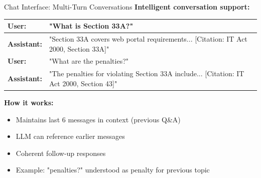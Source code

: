 \documentclass[11pt,aspectratio=16:9]{beamer}
\begin{document}
\begin{frame}{Chat Interface: Multi-Turn Conversations}
    \textbf{Intelligent conversation support:}
    
    \vspace{0.5cm}
    
    \begin{center}
        \small
        \begin{tabular}{|l|p{7cm}|}
            \hline
            \textbf{User:} & "What is Section 33A?" \\
            \hline
            \textbf{Assistant:} & "Section 33A covers web portal requirements... [Citation: IT Act 2000, Section 33A]" \\
            \hline
            \textbf{User:} & "What are the penalties?" \\
            \hline
            \textbf{Assistant:} & "The penalties for violating Section 33A include... [Citation: IT Act 2000, Section 43]" \\
            \hline
        \end{tabular}
    \end{center}
    
    \vspace{0.8cm}
    
    \textbf{How it works:}
    \begin{itemize}
        \item Maintains last 6 messages in context (previous Q\&A)
        \item LLM can reference earlier messages
        \item Coherent follow-up responses
        \item Example: "penalties?" understood as penalty for previous topic
    \end{itemize}
\end{frame}
\end{document}
